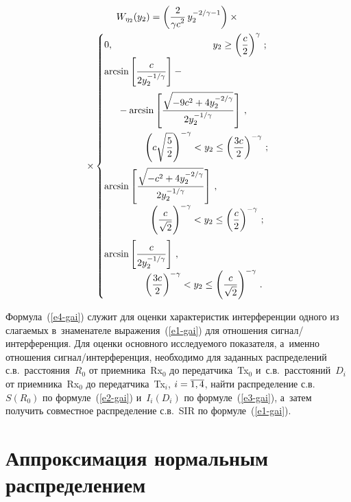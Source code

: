 \begin{multicols}{2}
\noindent
  \begin{multline}
  W_{\eta_2} (y_2)= \left( \fr{2}{\gamma c^2}\,y_2^{-2/\gamma-1}\right) \times{}\\
\times{}\begin{cases}
  0, &\hspace*{-5mm}y_2\geq \left(\fr{c}{2}\right)^{\gamma}\,;\\[6pt]
  \arcsin \left[ \fr{c}{2y_2^{-1/\gamma}}\right]- {}\\[14pt]
  &\hspace*{-40mm}{}-\arcsin \left[ \fr{\sqrt{-
9c^2+4y_2^{-2/\gamma}}}{2y_2^{-1/\gamma}}\right]\,,\\[14pt]
 &\hspace*{-30mm}  \left( 
c\sqrt{\fr{5}{2}}\right)^{-\gamma}<y_2 \leq \left( \fr{3c}{2}\right)^{-\gamma}\,;\\[14pt]
  \arcsin\left[\fr{\sqrt{-c^2+4y_2^{-2/\gamma}}}{2y_2^{-1/\gamma}}\right]\,, \\[6pt]
  &\hspace*{-28mm} 
  \left( \fr{c}{\sqrt{2}}\right)^{-\gamma}< y_2\leq \left( \fr{c}{2}\right)^{-
\gamma}\,;\\[14pt]
  \arcsin \left[ \fr{c}{2y_2^{-1/\gamma}}\right]\,,\\[6pt]
   &\hspace*{-30mm}  \left( \fr{3c}{2} 
\right)^{-\gamma} <  y_2\leq \left( \fr{c}{\sqrt{2}}\right)^{-\gamma}\,.
  \end{cases}
  \label{e4-gai}
  \end{multline}
  
  Формула~(\ref{e4-gai}) служит для оценки характеристик интерференции 
одного из слагаемых в~знаменателе выражения~(\ref{e1-gai}) для отношения 
сиг\-нал/ин\-тер\-фе\-рен\-ция. Для оценки основного исследуемого 
показателя, а~именно отношения сиг\-нал/ин\-тер\-фе\-рен\-ция, необходимо 
для заданных распределений с.в.\ расстояния~$R_0$ от приемника~Rx$_0$ 
до передатчика~Tx$_0$ и~с.в.\ расстояний~$D_i$ от приемника~Rx$_0$ до 
передатчика~Tx$_i$, $i\hm=\overline{1,4}$, найти распределение с.в.\ 
$S(R_0)$ по формуле~(\ref{e2-gai}) и~$I_i(D_i)$ по формуле~(\ref{e3-gai}), 
а~затем получить совместное распределение с.в.~SIR по  
формуле~(\ref{e1-gai}).
  
\section{Аппроксимация нормальным распределением}


\end{multicols}
